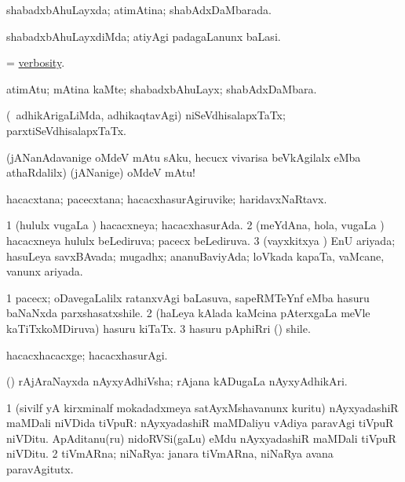 \bentry
{} 
\gl{\gu}
\expl{}
\bmng
 shabadxbAhuLayxda; atimAtina; shabAdxDaMbarada. 
\emng
\eentry

\bentry
{} 
\gl{\kirxvi}
\expl{}
\bmng
 shabadxbAhuLayxdiMda; atiyAgi padagaLanunx baLasi. 
\emng
\eentry

\bentry
{} 
\gl{\nA}
\expl{}
\bmng
 = \hyperlink{verbosity}{verbosity}. 
\emng
\eentry

\bentry
{} 
\gl{\nA}
\expl{}
\bmng
 atimAtu; mAtina kaMte; shabadxbAhuLayx; shabAdxDaMbara. 
\emng
\eentry

\bentry
{} 
\gl{\gu}
\expl{\G\ }
\bmng
 (\kanmu\ adhikArigaLiMda, adhikaqtavAgi) niSeVdhisalapxTaTx; parxtiSeVdhisalapxTaTx. 
\emng
\eentry

\bentry
{} 
\gl{\BAavayx}
\expl{}
\bmng
 (jANanAdavanige oMdeV mAtu sAku, hecucx vivarisa beVkAgilalx eMba athaRdalilx) (jANanige) oMdeV mAtu! 
\emng
\eentry

\bentry
{} 
\gl{\nA}
\expl{}
\bmng
 hacacxtana; pacecxtana; hacacxhasurAgiruvike; haridavxNaRtavx. 
\emng
\eentry

\bentry
{} 
\gl{\gu}
\expl{}
\bmng
\bnum
\num{1} (hululx \mo vugaLa \vi) hacacxneya; hacacxhasurAda. 
\num{2} (meYdAna, hola, \mo vugaLa \vi) hacacxneya hululx beLediruva; pacecx beLediruva. 
\num{3} (vayxkitxya \vi) EnU ariyada; hasuLeya savxBAvada; mugadhx; ananuBaviyAda; loVkada kapaTa, vaMcane, \mo vanunx ariyada. 
\enum
\emng
\eentry

\bentry
{} 
\gl{\nA}
\expl{}
\bmng
\bnum
\num{1} pacecx; oDavegaLalilx ratanxvAgi baLasuva, sapeRMTeYnf eMba hasuru baNaNxda parxshasatxshile. 
\num{2} (haLeya kAlada kaMcina pAterxgaLa meVle kaTiTxkoMDiruva) hasuru kiTaTx. 
\num{3} hasuru pAphiRri () shile. 
\enum
\emng
\eentry

\bentry
{} 
\gl{\kirxvi}
\expl{}
\bmng
 hacacxhacacxge; hacacxhasurAgi. 
\emng
\eentry

\bentry
{} 
\gl{\nA}
\expl{}
\bmng
 (\birx) rAjAraNayxda nAyxyAdhiVsha; rAjana kADugaLa nAyxyAdhikAri. 
\emng
\eentry

\bentry
{} 
\gl{\nA}
\expl{}
\bmng
\bnum
\num{1} (sivilf yA kirxminalf mokadadxmeya satAyxMshavanunx kuritu) nAyxyadashiR maMDali niVDida tiVpuR:  nAyxyadashiR maMDaliyu vAdiya paravAgi tiVpuR niVDitu.  ApAditanu(ru) nidoRVSi(gaLu) eMdu nAyxyadashiR maMDali tiVpuR niVDitu. 
\num{2} tiVmARna; niNaRya:  janara tiVmARna, niNaRya avana paravAgitutx. 
\enum
\emng
\eentry

